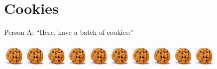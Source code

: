 \documentclass[12pt]{article}
\begin{document}
\maketitle

\section{Cookies}
Person A: ``Here, have a batch of cookies:''\\
\\
\includegraphics[height=10mm, width=10mm]{cookie.jpg}
\includegraphics[height=10mm, width=10mm]{cookie.jpg}
\includegraphics[height=10mm, width=10mm]{cookie.jpg}
\includegraphics[height=10mm, width=10mm]{cookie.jpg}
\includegraphics[height=10mm, width=10mm]{cookie.jpg}
\includegraphics[height=10mm, width=10mm]{cookie.jpg}
\includegraphics[height=10mm, width=10mm]{cookie.jpg}
\includegraphics[height=10mm, width=10mm]{cookie.jpg}
\includegraphics[height=10mm, width=10mm]{cookie.jpg}
\includegraphics[height=10mm, width=10mm]{cookie.jpg}
\end{document}
